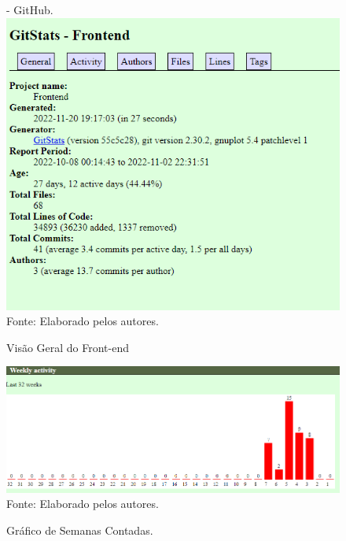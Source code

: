 \documentclass[
    12pt,               %
    openright,          %
    oneside,
    a4paper,            %
    BIBLATEX,           %
    TODO,               %
    english,            %
    brazil              %
    ]{ifsp-spo-inf-ctds}
\begin{document}
        \begin{figure}[H]
                \centering
                \caption{Visão Geral do Front-end} - GitHub.
                \includegraphics[width=1 \textwidth]{Gitstats/front-end/geralFront.png}
                {\footnotesize Fonte: Elaborado pelos autores.}
                \label{fig:geralFront}
        \end{figure}     

        \begin{figure}[H]
                \centering
                \caption{Gráfico de Semanas Contadas.}
                \includegraphics[width=1 \textwidth]{Gitstats/front-end/SemanasFront.png}
                {\footnotesize Fonte: Elaborado pelos autores.}
                \label{fig:semanasFront}
        \end{figure}    
\end{document}
